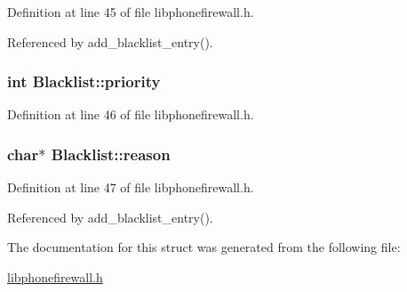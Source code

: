 Definition at line 45 of file libphonefirewall.h.

Referenced by add\_\-blacklist\_\-entry().\hypertarget{structBlacklist_a5370eb6240b6e528ce56fb10d7e9249}{
\subsubsection{\setlength{\rightskip}{0pt plus 5cm}int {\bf Blacklist::priority}}}
\label{structBlacklist_a5370eb6240b6e528ce56fb10d7e9249}




Definition at line 46 of file libphonefirewall.h.\hypertarget{structBlacklist_4aaebfcc863267f326258e0622bf7303}{
\subsubsection{\setlength{\rightskip}{0pt plus 5cm}char$\ast$ {\bf Blacklist::reason}}}
\label{structBlacklist_4aaebfcc863267f326258e0622bf7303}




Definition at line 47 of file libphonefirewall.h.

Referenced by add\_\-blacklist\_\-entry().

The documentation for this struct was generated from the following file:\begin{CompactItemize}
\item 
\hyperlink{libphonefirewall_8h}{libphonefirewall.h}\end{CompactItemize}
